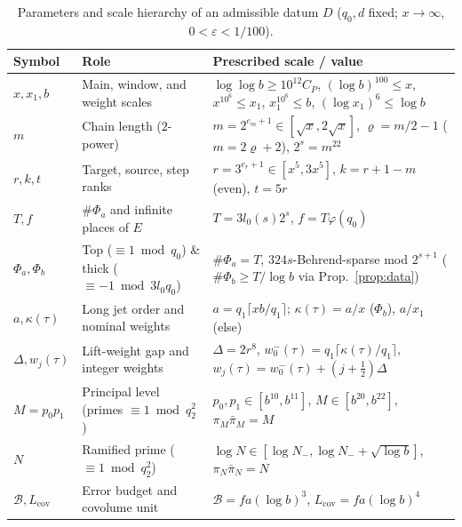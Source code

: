 \documentclass[11pt]{amsart}
\newcommand{\eps}{\varepsilon}
\newcommand{\cB}{\mathcal{B}}
\theoremstyle{definition}
\theoremstyle{remark}
\begin{document}
\begin{table}[tbp]
\centering\footnotesize
\caption{Parameters and scale hierarchy of an admissible datum $D$ ($q_0,d$ fixed; $x\to\infty$, $0<\eps<1/100$).}\label{tab:scales}
\begin{tabular}{@{}l>{\raggedright\arraybackslash}p{}>{\raggedright\arraybackslash}p{}@{}}
\toprule
Symbol & Role & Prescribed scale / value\\
\midrule
$x,x_1,b$ & Main, window, and weight scales & $\log\log b\ge 10^{12}C_P$, $(\log b)^{100}\le x$, $x^{10^6}\le x_1$, $x_1^{10^6}\le b$, $(\log x_1)^6\le\log b$\\
$m$ & Chain length ($2$-power) & $m=2^{e_m+1}\in[\sqrt{x},2\sqrt{x}]$, $\varrho=m/2-1$ ($m=2\varrho+2$), $2^s=m^{22}$\\
$r,k,t$ & Target, source, step ranks & $r=3^{e_r+1}\in[x^5,3x^5]$, $k=r+1-m$ (even), $t=5r$\\
$T,f$ & $\#\Phi_a$ and infinite places of $E$ & $T=3l_0(s)2^s$, $f=T\varphi(q_0)$\\
$\Phi_a,\Phi_b$ & Top ($\equiv 1\bmod q_0$) \& thick ($\equiv -1\bmod 3l_0q_0$) & $\#\Phi_a=T$, $324s$-Behrend-sparse mod $2^{s+1}$ ($\#\Phi_b\ge T/\log b$ via Prop.~\ref{prop:data})\\
$a,\kappa(\tau)$ & Long jet order and nominal weights & $a=q_1\lceil xb/q_1\rceil$; $\kappa(\tau)=a/x$ ($\Phi_b$), $a/x_1$ (else)\\
$\Delta,w_j(\tau)$ & Lift-weight gap and integer weights & $\Delta=2r^8$, $w_0^-(\tau)=q_1\lceil\kappa(\tau)/q_1\rceil$, $w_j(\tau)=w_0^-(\tau)+(j+\frac12)\Delta$\\
$M=p_0p_1$ & Principal level (primes $\equiv 1\bmod q_2^2$) & $p_0,p_1\in[b^{10},b^{11}]$, $M\in[b^{20},b^{22}]$, $\pi_M\bar\pi_M=M$\\
$N$ & Ramified prime ($\equiv 1\bmod q_2^2$) & $\log N\in[\log N_-,\log N_-+\sqrt{\log b}]$, $\pi_N\bar\pi_N=N$\\
$\cB,L_{\mathrm{cov}}$ & Error budget and covolume unit & $\cB=fa(\log b)^3$, $L_{\mathrm{cov}}=fa(\log b)^4$\\
\bottomrule
\end{tabular}
\end{table}
\end{document}
